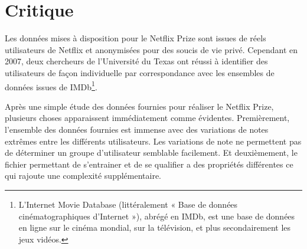 \vspace{5mm}






\section{Critique}


Les données mises à disposition pour le Netflix Prize sont issues de réels utilisateurs de Netflix et anonymisées pour des soucis de vie privé. Cependant en 2007, deux chercheurs de l’Université du Texas\supercite{Anonymity} ont réussi à identifier des utilisateurs de façon individuelle par correspondance avec les ensembles de données issues de IMDb\footnote{L’Internet Movie Database (littéralement « Base de données cinématographiques d'Internet »), abrégé en IMDb, est une base de données en ligne sur le cinéma mondial, sur la télévision, et plus secondairement les jeux vidéos.}. 

\vspace{5mm} 

Après une simple étude des données fournies pour réaliser le Netflix Prize, plusieurs choses apparaissent immédiatement comme évidentes. Premièrement, l’ensemble des données fournies est immense avec des variations de notes extrêmes entre les différents utilisateurs. Les variations de note ne permettent pas de déterminer un groupe d’utilisateur semblable facilement. Et deuxièmement, le fichier permettant de s’entrainer et de se qualifier a des propriétés différentes ce qui rajoute une complexité supplémentaire. 

